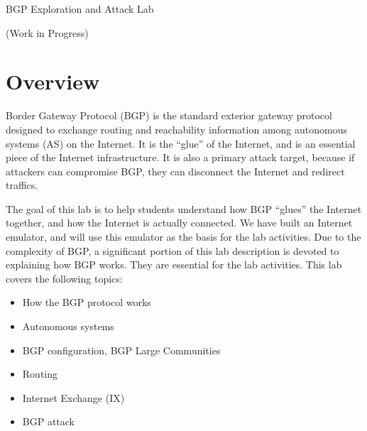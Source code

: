 
\newcommand{\commonfolder}{../../common-files}





\newcommand{\bgpFigs}{./Figs}




\begin{center}
{\LARGE BGP Exploration and Attack Lab}

  \vspace{0.1in}
  {\LARGE (Work in Progress)}
\end{center}


\tableofcontents




\section{Overview}

Border Gateway Protocol (BGP) is the standard exterior gateway protocol
designed to exchange routing and reachability information among autonomous
systems (AS) on the Internet. It is the ``glue'' of the Internet,
and is an essential piece of the Internet infrastructure. It is 
also a primary attack target, because if attackers can 
compromise BGP, they can disconnect the Internet and redirect traffics. 

The goal of this lab is to help students understand how
BGP ``glues'' the Internet together, and how the Internet is actually
connected. We have built an Internet emulator, and will 
use this emulator as the basis for the lab activities. Due to the 
complexity of BGP, a significant portion of this lab description 
is devoted to explaining how BGP works. They are 
essential for the lab activities. 
This lab covers the following topics:
\begin{itemize}[noitemsep]
\item How the BGP protocol works
\item Autonomous systems
\item BGP configuration, BGP Large Communities 
\item Routing 
\item Internet Exchange (IX)
\item BGP attack
\end{itemize}


